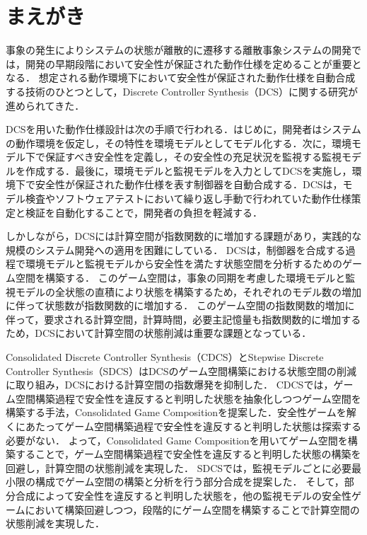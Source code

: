 \section{まえがき}
\label{section:introduction}
事象の発生によりシステムの状態が離散的に遷移する離散事象システムの開発では，開発の早期段階において安全性が保証された動作仕様を定めることが重要となる．
想定される動作環境下において安全性が保証された動作仕様を自動合成する技術のひとつとして，Discrete Controller Synthesis（DCS）\cite{paper:SupervisoryControl}に関する研究が進められてきた．

DCSを用いた動作仕様設計は次の手順で行われる．はじめに，開発者はシステムの動作環境を仮定し，その特性を環境モデルとしてモデル化する．次に，環境モデル下で保証すべき安全性を定義し，その安全性の充足状況を監視する監視モデルを作成する．最後に，環境モデルと監視モデルを入力としてDCSを実施し，環境下で安全性が保証された動作仕様を表す制御器を自動合成する．DCSは，モデル検査やソフトウェアテストにおいて繰り返し手動で行われていた動作仕様策定と検証を自動化することで，開発者の負担を軽減する．

しかしながら，DCSには計算空間が指数関数的に増加する課題があり，実践的な規模のシステム開発への適用を困難にしている．
DCSは，制御器を合成する過程で環境モデルと監視モデルから安全性を満たす状態空間を分析するためのゲーム空間を構築する．
このゲーム空間は，事象の同期を考慮した環境モデルと監視モデルの全状態の直積により状態を構築するため，それぞれのモデル数の増加に伴って状態数が指数関数的に増加する．
このゲーム空間の指数関数的増加に伴って，要求される計算空間，計算時間，必要主記憶量も指数関数的に増加するため，DCSにおいて計算空間の状態削減は重要な課題となっている．

Consolidated Discrete Controller Synthesis（CDCS）\cite{yamauchi:IPSJ2024}とStepwise Discrete Controller Synthesis（SDCS）\cite{yamauchi:IEICEJ2023}はDCSのゲーム空間構築における状態空間の削減に取り組み，DCSにおける計算空間の指数爆発を抑制した．
CDCS\cite{yamauchi:IPSJ2024}では，ゲーム空間構築過程で安全性を違反すると判明した状態を抽象化しつつゲーム空間を構築する手法，Consolidated Game Compositionを提案した．安全性ゲームを解くにあたってゲーム空間構築過程で安全性を違反すると判明した状態は探索する必要がない．
よって，Consolidated Game Compositionを用いてゲーム空間を構築することで，ゲーム空間構築過程で安全性を違反すると判明した状態の構築を回避し，計算空間の状態削減を実現した．
SDCS\cite{yamauchi:IEICEJ2023}では，監視モデルごとに必要最小限の構成でゲーム空間の構築と分析を行う部分合成を提案した．
そして，部分合成によって安全性を違反すると判明した状態を，他の監視モデルの安全性ゲームにおいて構築回避しつつ，段階的にゲーム空間を構築することで計算空間の状態削減を実現した．

